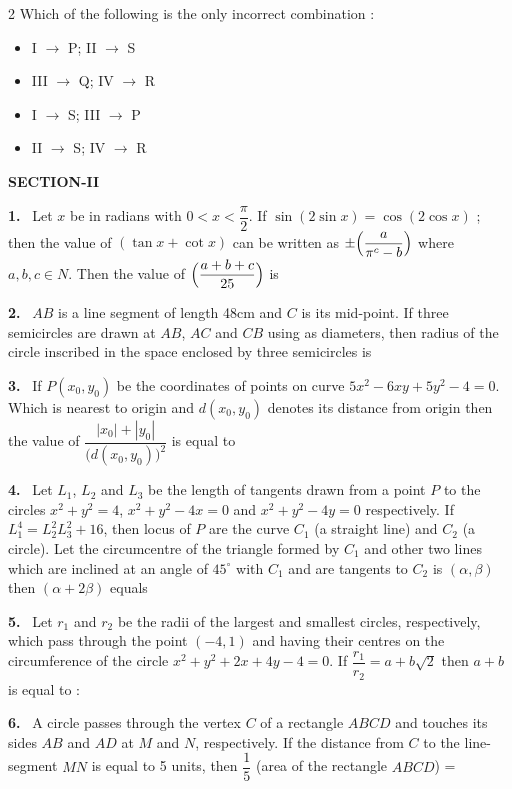 \documentclass[10pt]{extarticle}
\newcommand{\sect}[1]{\par\smallskip\noindent\textbf{#1}\par}
\newcommand{\qn}[1]{\par\smallskip\noindent\textbf{#1.}~}
\newenvironment{qoptions}{\begin{itemize}[leftmargin=1.8em,itemsep=1pt,topsep=2pt,label={}]}{\end{itemize}}
\newcommand{\opt}[2]{\item[(#1)] #2}
\begin{document}
\begin{multicols}{2}
Which of the following is the only incorrect combination :
\begin{qoptions}
\opt{A}{I $\to$ P; II $\to$ S}
\opt{B}{III $\to$ Q; IV $\to$ R}
\opt{C}{I $\to$ S; III $\to$ P}
\opt{D}{II $\to$ S; IV $\to$ R}
\end{qoptions}
\sect{SECTION-II}
\qn{1} Let $x$ be in radians with $0<x<\dfrac\pi2$. If $\sin(2\sin x)=\cos(2\cos x)$ ; then the value of $(\tan x+\cot x)$ can be written as $\pm\Bigl(\dfrac{a}{\pi^c-b}\Bigr)$ where $a,b,c\in N$. Then the value of $\Bigl(\dfrac{a+b+c}{25}\Bigr)$ is
\qn{2} $AB$ is a line segment of length 48cm and $C$ is its mid-point. If three semicircles are drawn at $AB$, $AC$ and $CB$ using as diameters, then radius of the circle inscribed in the space enclosed by three semicircles is
\qn{3} If $P(x_0,y_0)$ be the coordinates of points on curve $5x^2-6xy+5y^2-4=0$. Which is nearest to origin and $d(x_0,y_0)$ denotes its distance from origin then the value of $\dfrac{|x_0|+|y_0|}{\bigl(d(x_0,y_0)\bigr)^2}$ is equal to
\qn{4} Let $L_1$, $L_2$ and $L_3$ be the length of tangents drawn from a point $P$ to the circles $x^2+y^2=4$, $x^2+y^2-4x=0$ and $x^2+y^2-4y=0$ respectively. If $L_1^4=L_2^2L_3^2+16$, then locus of $P$ are the curve $C_1$ (a straight line) and $C_2$ (a circle). Let the circumcentre of the triangle formed by $C_1$ and other two lines which are inclined at an angle of $45^\circ$ with $C_1$ and are tangents to $C_2$ is $(\alpha,\beta)$ then $(\alpha+2\beta)$ equals
\qn{5} Let $r_1$ and $r_2$ be the radii of the largest and smallest circles, respectively, which pass through the point $(-4,1)$ and having their centres on the circumference of the circle $x^2+y^2+2x+4y-4=0$. If $\dfrac{r_1}{r_2}=a+b\sqrt2$ then $a+b$ is equal to :
\qn{6} A circle passes through the vertex $C$ of a rectangle $ABCD$ and touches its sides $AB$ and $AD$ at $M$ and $N$, respectively. If the distance from $C$ to the line-segment $MN$ is equal to 5 units, then $\dfrac15$ (area of the rectangle $ABCD$) =

\end{multicols}
\end{document}
